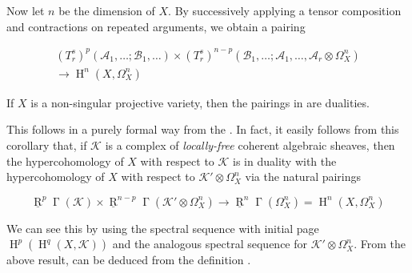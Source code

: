 Now let $n$ be the dimension of $X$.
By successively applying a tensor composition  and contractions  on repeated arguments, we obtain a pairing

\begin{equation}\tag{8.6}\label{fga1-equation-8.6}
  \begin{aligned}
    (T_r^s)^p(\mathcal{A}_1,\ldots;\mathcal{B}_1,\ldots)
    \times (T_r^s)^{n-p}(\mathcal{B}_1,\ldots;\mathcal{A}_1,\ldots,\mathcal{A}_r\otimes\Omega_X^n)
    \\\to\operatorname{H}^n(X,\Omega_X^n)
  \end{aligned}
\end{equation}

\begin{theorem}\label{fga1-theorem-6}
  If $X$ is a non-singular projective variety, then the pairings in  are dualities.
\end{theorem}

\begin{cproof}

  This follows in a purely formal way from the .
  In fact, it easily follows from this corollary that, if $\mathcal{K}$ is a complex of \emph{locally-free} coherent algebraic sheaves, then the hypercohomology of $X$ with respect to $\mathcal{K}$ is in duality with the hypercohomology of $X$ with respect to $\mathcal{K}'\otimes\Omega_X^n$ via the natural pairings

  \begin{equation}\tag{8.7}\label{fga1-equation-8.7}
    \underline{\operatorname{R}}^p\operatorname{\Gamma}(\mathcal{K})
    \times \underline{\operatorname{R}}^{n-p}\operatorname{\Gamma}(\mathcal{K}'\otimes\Omega_X^n)
    \to \underline{\operatorname{R}}^n\operatorname{\Gamma}(\Omega_X^n)
    = \operatorname{H}^n(X,\Omega_X^n)
  \end{equation}

  We can see this by using the spectral sequence with initial page $\operatorname{H}^p(\operatorname{H}^q(X,\mathcal{K}))$ and the analogous spectral sequence for $\mathcal{K}'\otimes\Omega_X^n$.
  From the above result,  can be deduced from the definition .
\end{cproof}

